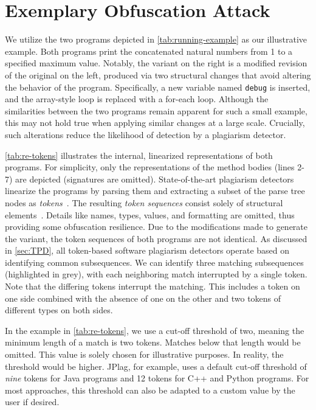 
\section{Exemplary Obfuscation Attack}\label{sec:threatmodel-example}\label{sec:ase:RunningExample}

\noindent
We utilize the two programs depicted in \autoref{tab:running-example} as our illustrative example.
Both programs print the concatenated natural numbers from 1 to a specified maximum value. 
Notably, the variant on the right is a modified revision of the original on the left, produced via two structural changes that avoid altering the behavior of the program.
Specifically, a new variable named \texttt{debug} is inserted, and the array-style loop is replaced with a for-each loop.
Although the similarities between the two programs remain apparent for such a small example, this may not hold true when applying similar changes at a large scale.
Crucially, such alterations reduce the likelihood of detection by a plagiarism detector.

\autoref{tab:re-tokens} illustrates the internal, linearized representations of both programs. For simplicity, only the representations of the method bodies (lines 2-7) are depicted (signatures are omitted).
State-of-the-art plagiarism detectors linearize the programs by parsing them and extracting a subset of the parse tree nodes as \textit{tokens}~\cite{Saglam2024b}.
The resulting \textit{token sequences} consist solely of structural elements~\cite{prechelt2000}.
Details like names, types, values, and formatting are omitted, thus providing some obfuscation resilience.
Due to the modifications made to generate the variant, the token sequences of both programs are not identical.
As discussed in \autoref{sec:TPD}, all token-based software plagiarism detectors operate based on identifying common subsequences.
We can identify three matching subsequences (highlighted in grey), with each neighboring match interrupted by a single token.
Note that the differing tokens interrupt the matching. This includes a token on one side combined with the absence of one on the other and two tokens of different types on both sides.

In the example in \autoref{tab:re-tokens}, we use a cut-off threshold of two, meaning the minimum length of a match is two tokens. Matches below that length would be omitted. This value is solely chosen for illustrative purposes. In reality, the threshold would be higher. JPlag, for example, uses a default cut-off threshold of \textit{nine} tokens for Java programs and 12 tokens for C++ and Python programs. For most approaches, this threshold can also be adapted to a custom value by the user if desired.

